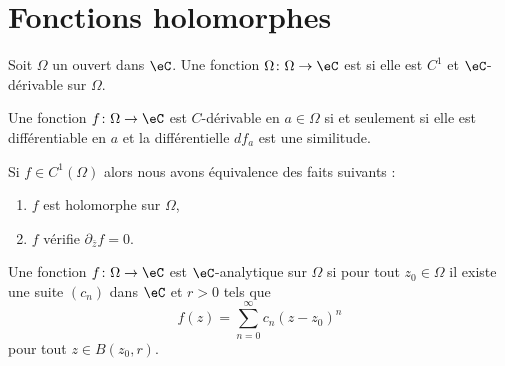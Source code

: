 
\section{Fonctions holomorphes}

\begin{definition}
    Soit \( \Omega\) un ouvert dans \( \eC\). Une fonction \( \Omega\colon \Omega\to \eC\) est  si elle est \( C^1\) et \( \eC\)-dérivable sur \( \Omega\). 
\end{definition}

\begin{proposition}
    Une fonction \( f\colon\Omega \to \eC\) est $C$-dérivable en \( a\in\Omega\) si et seulement si elle est différentiable en \( a\) et la différentielle \( df_a\) est une similitude.
\end{proposition}

\begin{theorem}
    Si \( f\in C^1(\Omega)\) alors nous avons équivalence des faits suivants :
    \begin{enumerate}
        \item
            \( f\) est holomorphe sur \( \Omega\),
        \item
            \( f\) vérifie \( \partial_{\bar z}f=0\).
    \end{enumerate}
\end{theorem}

\begin{definition}
    Une fonction \( f\colon \Omega\to \eC\) est \( \eC\)-analytique sur \( \Omega\) si pour tout \( z_0\in \Omega\) il existe une suite \( (c_n)\) dans \( \eC\) et \( r>0\) tels que
    \begin{equation}
        f(z)=\sum_{n=0}^{\infty}c_n(z-z_0)^n
    \end{equation}
    pour tout \( z\in B(z_0,r)\).
\end{definition}

